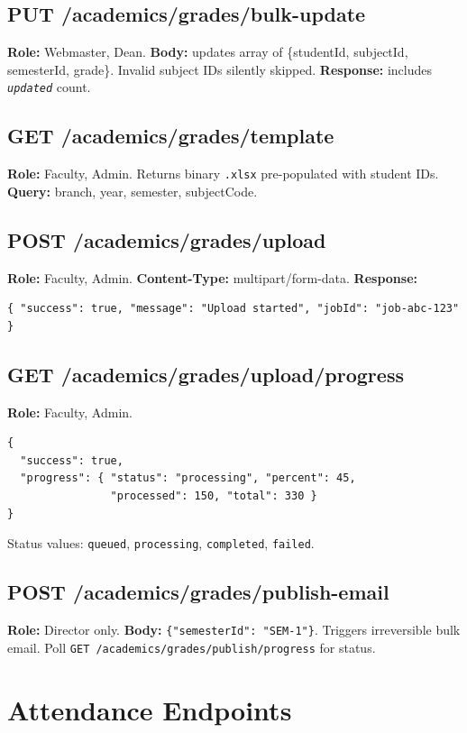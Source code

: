 \documentclass[12pt,a4paper]{report}
\newcommand{\api}[1]{\texttt{\small #1}}
\newcommand{\field}[1]{\texttt{\textit{#1}}}
\newcommand{\code}[1]{\texttt{#1}}
\begin{document}
\subsection{PUT /academics/grades/bulk-update}
\textbf{Role:} Webmaster, Dean. \textbf{Body:} updates array of \{studentId, subjectId, semesterId, grade\}. Invalid subject IDs silently skipped. \textbf{Response:} includes \field{updated} count.

\subsection{GET /academics/grades/template}
\textbf{Role:} Faculty, Admin. Returns binary \code{.xlsx} pre-populated with student IDs. \textbf{Query:} branch, year, semester, subjectCode.

\subsection{POST /academics/grades/upload}
\textbf{Role:} Faculty, Admin. \textbf{Content-Type:} multipart/form-data. \textbf{Response:}
\begin{lstlisting}[caption={Upload initiated},label={lst:uploadstart}]
{ "success": true, "message": "Upload started", "jobId": "job-abc-123" }
\end{lstlisting}

\subsection{GET /academics/grades/upload/progress}
\textbf{Role:} Faculty, Admin.
\begin{lstlisting}[caption={Upload progress},label={lst:progress}]
{
  "success": true,
  "progress": { "status": "processing", "percent": 45,
                "processed": 150, "total": 330 }
}
\end{lstlisting}
Status values: \code{queued}, \code{processing}, \code{completed}, \code{failed}.

\subsection{POST /academics/grades/publish-email}
\textbf{Role:} Director only. \textbf{Body:} \code{\{"semesterId": "SEM-1"\}}. Triggers irreversible bulk email. Poll \api{GET /academics/grades/publish/progress} for status.

\section{Attendance Endpoints}
\end{document}
